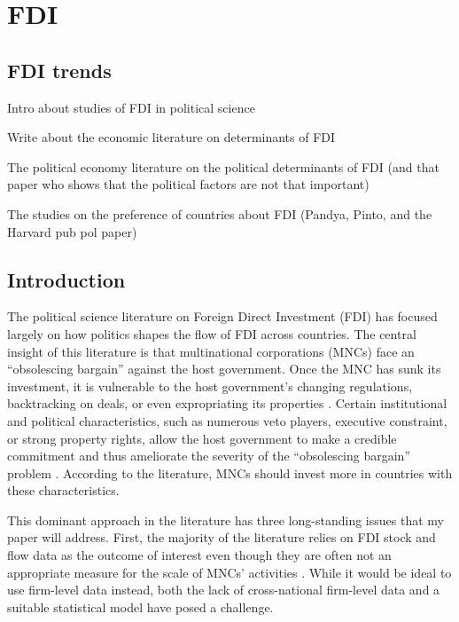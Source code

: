 \chapter{FDI}
\label{chap:FDI}

\section{FDI trends}

Intro about studies of FDI in political science

Write about the economic literature on determinants of FDI

The political economy literature on the political determinants of FDI (and that
paper who shows that the political factors are not that important)

The studies on the preference of countries about FDI (Pandya, Pinto, and the
Harvard pub pol paper)


\section{Introduction}
\label{sec:introduction}

The political science literature on Foreign Direct Investment (FDI) has focused largely on how politics shapes the flow of FDI across countries. The central insight of this literature is that multinational corporations (MNCs) face an ``obsolescing bargain'' against the host government. Once the MNC has sunk its investment, it is vulnerable to the host government's changing regulations, backtracking on deals, or even expropriating its properties \citep{Li2009a, Sawant2010}. Certain institutional and political characteristics, such as numerous veto players, executive constraint, or strong property rights, allow the host government to make a credible commitment and thus ameliorate the severity of the ``obsolescing bargain'' problem \citep{Busse2007, Jensen2014, Li2003}. According to the literature, MNCs should invest more in countries with these characteristics.

This dominant approach in the literature has three long-standing issues that my paper will address. First, the majority of the literature relies on FDI stock and flow data as the outcome of interest even though they are often not an appropriate measure for the scale of MNCs' activities \citep{Kerner2014}. While it would be ideal to use firm-level data instead, both the lack of cross-national firm-level data and a suitable statistical model have posed a challenge.

